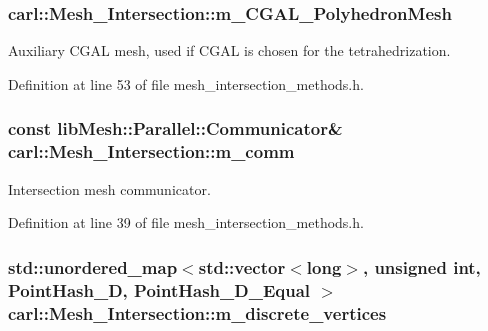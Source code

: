 \subsubsection[{m\+\_\+\+C\+G\+A\+L\+\_\+\+Polyhedron\+Mesh}]{ carl\+::\+Mesh\+\_\+\+Intersection\+::m\+\_\+\+C\+G\+A\+L\+\_\+\+Polyhedron\+Mesh\hspace{0.3cm}{\ttfamily [protected]}}\label{classcarl_1_1_mesh___intersection_a256506b058cda4c9b767d14277b9650c}


Auxiliary C\+G\+A\+L mesh, used if C\+G\+A\+L is chosen for the tetrahedrization. 



Definition at line 53 of file mesh\+\_\+intersection\+\_\+methods.\+h.

\hypertarget{classcarl_1_1_mesh___intersection_a418cf274a01b6aea560249a468574124}{}
\subsubsection[{m\+\_\+comm}]{\setlength{\rightskip}{0pt plus 5cm}const lib\+Mesh\+::\+Parallel\+::\+Communicator\& carl\+::\+Mesh\+\_\+\+Intersection\+::m\+\_\+comm\hspace{0.3cm}{\ttfamily [protected]}}\label{classcarl_1_1_mesh___intersection_a418cf274a01b6aea560249a468574124}


Intersection mesh communicator. 



Definition at line 39 of file mesh\+\_\+intersection\+\_\+methods.\+h.

\hypertarget{classcarl_1_1_mesh___intersection_a5c5abcce2f778e50c5c8a5265692c96f}{}
\subsubsection[{m\+\_\+discrete\+\_\+vertices}]{\setlength{\rightskip}{0pt plus 5cm}std\+::unordered\+\_\+map$<$std\+::vector$<$long$>$, unsigned int, {\bf Point\+Hash\+\_\+D}, {\bf Point\+Hash\+\_\+D\+\_\+\+Equal} $>$ carl\+::\+Mesh\+\_\+\+Intersection\+::m\+\_\+discrete\+\_\+vertices\hspace{0.3cm}{\ttfamily [protected]}}\label{classcarl_1_1_mesh___intersection_a5c5abcce2f778e50c5c8a5265692c96f}


